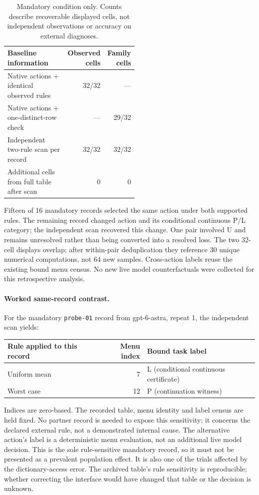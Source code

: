 \begin{table}[h]
\centering\small
\begin{tabular}{p{0.52\linewidth}rr}
\toprule
Baseline information & Observed cells & Family cells\\
\midrule
Native actions + identical observed rules & 32/32 & ---\\
Native actions + one-distinct-row check & --- & 29/32\\
Independent two-rule scan per record & 32/32 & 32/32\\
Additional cells from full table after scan & 0 & 0\\
\bottomrule
\end{tabular}
\caption{Mandatory condition only. Counts describe recoverable displayed
cells, not independent observations or accuracy on external diagnoses.}
\end{table}

Fifteen of 16 mandatory records selected the same action under both supported
rules. The remaining record changed action and its conditional continuous
P/L category; the independent
scan recovered this change. One pair involved U and remains unresolved rather
than being converted into a resolved loss. The two 32-cell displays overlap;
after within-pair deduplication they reference 30 unique numerical computations,
not 64 new samples. Cross-action labels reuse the existing bound menu census.
No new live model counterfactuals were collected for this retrospective analysis.

\paragraph{Worked same-record contrast.}
For the mandatory \texttt{probe-01} record from gpt-6-astra, repeat 1,
the independent scan yields:
\begin{center}
\begin{tabular}{lrl}\toprule
Rule applied to this record & Menu index & Bound task label\\\midrule
Uniform mean & 7 & L (conditional continuous certificate)\\
Worst case & 12 & P (continuation witness)\\\bottomrule
\end{tabular}
\end{center}
Indices are zero-based. The recorded table, menu identity and label census
are held fixed. No partner record is needed to expose this sensitivity;
it concerns the declared external rule, not a demonstrated internal cause.
The alternative action's label is a deterministic menu evaluation, not an
additional live model decision. This is the sole rule-sensitive mandatory
record, so it must not be presented as a prevalent population effect.
It is also one of the trials affected by the dictionary-access error.
The archived table's rule sensitivity is reproducible; whether correcting
the interface would have changed that table or the decision is unknown.

